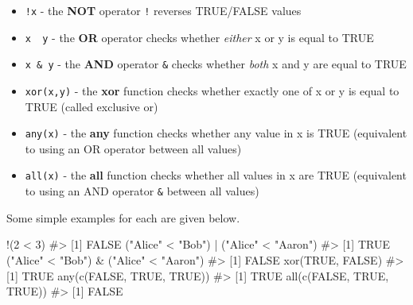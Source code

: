 \documentclass[
  letterpaper,
]{krantz}
\makeatletter
\newenvironment{Shaded}{\begin{snugshade}}{\end{snugshade}}
\newcommand{\CommentTok}[1]{\textcolor[rgb]{0.37,0.37,0.37}{#1}}
\newcommand{\ConstantTok}[1]{\textcolor[rgb]{0.56,0.35,0.01}{#1}}
\newcommand{\DecValTok}[1]{\textcolor[rgb]{0.68,0.00,0.00}{#1}}
\newcommand{\FunctionTok}[1]{\textcolor[rgb]{0.28,0.35,0.67}{#1}}
\newcommand{\NormalTok}[1]{\textcolor[rgb]{0.00,0.23,0.31}{#1}}
\newcommand{\SpecialCharTok}[1]{\textcolor[rgb]{0.37,0.37,0.37}{#1}}
\newcommand{\StringTok}[1]{\textcolor[rgb]{0.13,0.47,0.30}{#1}}
\providecommand{\tightlist}{%
  \setlength{\itemsep}{0pt}\setlength{\parskip}{0pt}}\usepackage{longtable,booktabs,array}
\newenvironment{kframe}{%
\medskip{}
\setlength{\fboxsep}{.8em}
 \def\at@end@of@kframe{}%
 \ifinner\ifhmode%
  \def\at@end@of@kframe{\end{minipage}}%
  \begin{minipage}{\columnwidth}%
 \fi\fi%
 \def\FrameCommand##1{\hskip\@totalleftmargin \hskip-\fboxsep
 \colorbox{shadecolor}{##1}\hskip-\fboxsep
     \hskip-\linewidth \hskip-\@totalleftmargin \hskip\columnwidth}%
 \MakeFramed {\advance\hsize-\width
   \@totalleftmargin\z@ \linewidth\hsize
   \@setminipage}}%
 {\par\unskip\endMakeFramed%
 \at@end@of@kframe}
\renewenvironment{Shaded}{\begin{kframe}}{\end{kframe}}
\makeatother
\begin{document}
\begin{itemize}
\tightlist
\item
  \texttt{!x} - the \textbf{NOT} operator \texttt{!} reverses TRUE/FALSE
  values
\item
  \texttt{x\ \textbar{}\ y} - the \textbf{OR} operator
  \texttt{\textbar{}} checks whether \emph{either} x or y is equal to
  TRUE
\item
  \texttt{x\ \&\ y} - the \textbf{AND} operator \texttt{\&} checks
  whether \emph{both} x and y are equal to TRUE
\item
  \texttt{xor(x,y)} - the \textbf{xor} function checks whether exactly
  one of x or y is equal to TRUE (called exclusive or)
\item
  \texttt{any(x)} - the \textbf{any} function checks whether any value
  in x is TRUE (equivalent to using an OR operator \texttt{\textbar{}}
  between all values)
\item
  \texttt{all(x)} - the \textbf{all} function checks whether all values
  in x are TRUE (equivalent to using an AND operator \texttt{\&} between
  all values)
\end{itemize}

Some simple examples for each are given below.

\begin{Shaded}
\begin{Highlighting}[]
\SpecialCharTok{!}\NormalTok{(}\DecValTok{2} \SpecialCharTok{\textless{}} \DecValTok{3}\NormalTok{)}
\CommentTok{\#\textgreater{} [1] FALSE}
\NormalTok{(}\StringTok{"Alice"} \SpecialCharTok{\textless{}} \StringTok{"Bob"}\NormalTok{) }\SpecialCharTok{|}\NormalTok{ (}\StringTok{"Alice"} \SpecialCharTok{\textless{}} \StringTok{"Aaron"}\NormalTok{)}
\CommentTok{\#\textgreater{} [1] TRUE}
\NormalTok{(}\StringTok{"Alice"} \SpecialCharTok{\textless{}} \StringTok{"Bob"}\NormalTok{) }\SpecialCharTok{\&}\NormalTok{ (}\StringTok{"Alice"} \SpecialCharTok{\textless{}} \StringTok{"Aaron"}\NormalTok{)}
\CommentTok{\#\textgreater{} [1] FALSE}
\FunctionTok{xor}\NormalTok{(}\ConstantTok{TRUE}\NormalTok{, }\ConstantTok{FALSE}\NormalTok{)}
\CommentTok{\#\textgreater{} [1] TRUE}
\FunctionTok{any}\NormalTok{(}\FunctionTok{c}\NormalTok{(}\ConstantTok{FALSE}\NormalTok{, }\ConstantTok{TRUE}\NormalTok{, }\ConstantTok{TRUE}\NormalTok{))}
\CommentTok{\#\textgreater{} [1] TRUE}
\FunctionTok{all}\NormalTok{(}\FunctionTok{c}\NormalTok{(}\ConstantTok{FALSE}\NormalTok{, }\ConstantTok{TRUE}\NormalTok{, }\ConstantTok{TRUE}\NormalTok{))}
\CommentTok{\#\textgreater{} [1] FALSE}
\end{Highlighting}
\end{Shaded}
\end{document}

